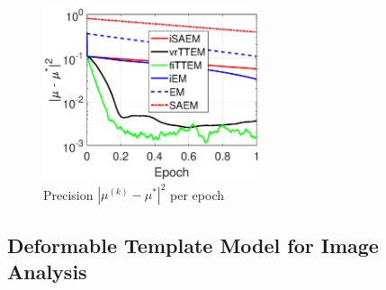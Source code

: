 \documentclass[conference,letterpaper]{IEEEtran}
\begin{document}
\vspace{-0.1in}
\begin{figure}[H]
\begin{center}
\includegraphics[width=2.5in]{fig/figgmm.eps}
\end{center}
\vspace{-0.1in}
\caption{Precision $|\mu^{(k)} - \mu^*|^2$ per epoch\vspace{0.2in}}
\label{fig:gmm_tts}%
\end{figure}

\subsection{Deformable Template Model for Image Analysis}
\end{document}
